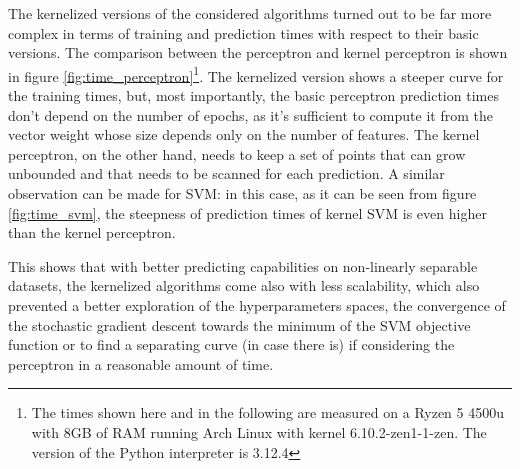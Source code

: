 \documentclass{article}
\begin{document}
The kernelized versions of the considered algorithms turned out to be far more complex in terms of training and prediction times with respect to their basic versions. The comparison between the perceptron and kernel perceptron is shown in figure \ref{fig:time_perceptron}\footnote{The times shown here and in the following are measured on a Ryzen 5 4500u with 8GB of RAM running Arch Linux with kernel 6.10.2-zen1-1-zen. The version of the Python interpreter is 3.12.4}.
The kernelized version shows a steeper curve for the training times, but, most importantly, the basic perceptron prediction times don't depend on the number of epochs, as it's sufficient to compute it from the vector weight whose size depends only on the number of features. The kernel perceptron, on the other hand, needs to keep a set of points that can grow unbounded and that needs to be scanned for each prediction.
A similar observation can be made for SVM: in this case, as it can be seen from figure \ref{fig:time_svm}, the steepness of prediction times of kernel SVM is even higher than the kernel perceptron.

This shows that with better predicting capabilities on non-linearly separable datasets, the kernelized algorithms come also with less scalability, which also prevented a better exploration of the hyperparameters spaces, the convergence of the stochastic gradient descent towards the minimum of the SVM objective function or to find a separating curve (in case there is) if considering the perceptron in a reasonable amount of time.
\end{document}
